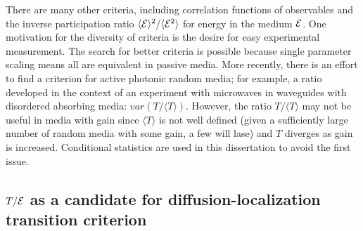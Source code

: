 There are many other criteria, including correlation functions \cite{2005_Yamilov_correlations}\cite{1999_van_Tiggelen}of observables and the inverse participation ratio $\langle {\cal E} \rangle^2 / \langle {\cal E}^2 \rangle$ for energy in the medium ${\cal E}$. One motivation for the diversity of criteria is the desire for easy experimental measurement. The search for better criteria is possible because single parameter scaling means all are equivalent in passive media. More recently, there is an effort to find a criterion for active photonic random media; for example, a ratio developed in the context of an experiment with microwaves in waveguides with disordered absorbing media\cite{2000_chabanov_nature}: $var(T/\langle T \rangle)$. However, the ratio $T/\langle T \rangle$ may not be useful in media with gain since $\langle T \rangle$ is not well defined (given a sufficiently large number of random media with some gain, a few will lase) and $T$ diverges as gain is increased. Conditional statistics are used in this dissertation to avoid the first issue. %

\subsection{$T/{\cal E}$ as a candidate for diffusion-localization transition criterion}
\label{sec:te_ratio_candidate}

